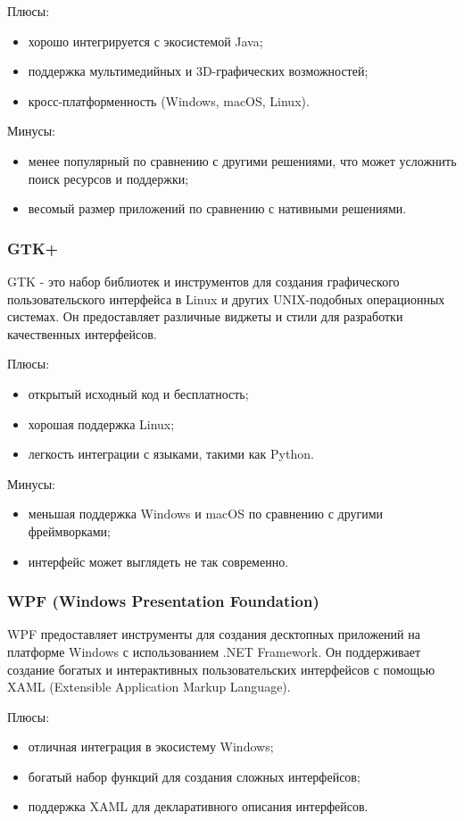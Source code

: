 Плюсы:
\begin{itemize}
\item хорошо интегрируется с экосистемой Java;
\item поддержка мультимедийных и 3D-графических возможностей;
\item кросс-платформенность (Windows, macOS, Linux).
\end{itemize}
Минусы:
\begin{itemize}
\item менее популярный по сравнению с другими решениями, что может усложнить поиск ресурсов и поддержки;
\item весомый размер приложений по сравнению с нативными решениями.
\end{itemize}

\subsubsection {GTK+}
GTK \cite{gtk} - это набор библиотек и инструментов для создания графического пользовательского интерфейса в Linux и других UNIX-подобных операционных системах. Он предоставляет различные виджеты и стили для разработки качественных интерфейсов.

Плюсы:
\begin{itemize}
\item открытый исходный код и бесплатность;
\item хорошая поддержка Linux;
\item легкость интеграции с языками, такими как Python.
\end{itemize}

Минусы:
\begin{itemize}
\item меньшая поддержка Windows и macOS по сравнению с другими фреймворками;
\item интерфейс может выглядеть не так современно.
\end{itemize}

\subsubsection {WPF (Windows Presentation Foundation)}
WPF \cite{wpf} предоставляет инструменты для создания десктопных приложений на платформе Windows с использованием .NET Framework. Он поддерживает создание богатых и интерактивных пользовательских интерфейсов с помощью XAML (Extensible Application Markup Language).

Плюсы:
\begin{itemize}
\item отличная интеграция в экосистему Windows;
\item богатый набор функций для создания сложных интерфейсов;
\item поддержка XAML для декларативного описания интерфейсов.
\end{itemize}

